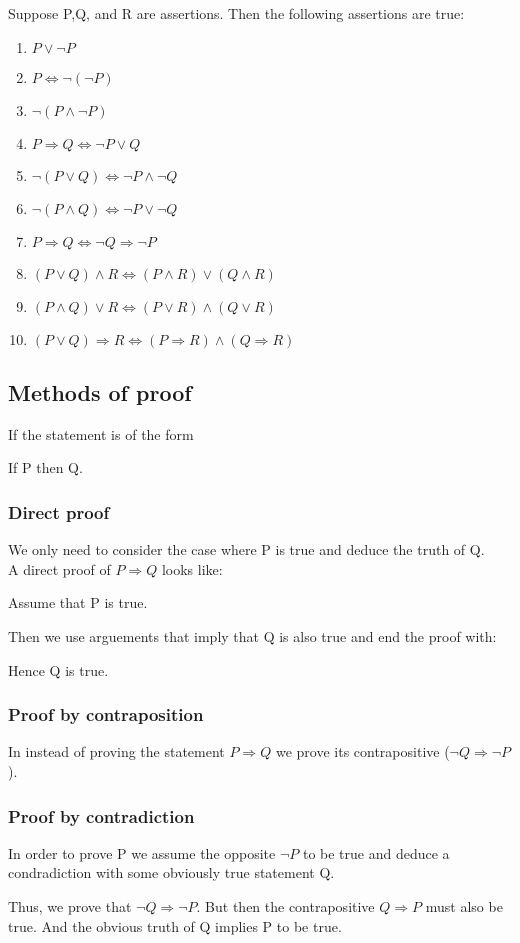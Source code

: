 \begin{theorem}
    Suppose P,Q, and R are assertions. Then the following assertions are true:
    \begin{enumerate}[label=(\alph*)]
        \item $P \lor \lnot P$
        \item $P \Leftrightarrow \lnot (\lnot P)$
        \item $\lnot (P \land \lnot P)$
        \item $P \Rightarrow Q \Leftrightarrow \lnot P \lor Q$
        \item $\lnot (P \lor Q) \Leftrightarrow \lnot P \land \lnot Q$
        \item $\lnot (P \land Q) \Leftrightarrow \lnot P \lor \lnot Q$
        \item $P \Rightarrow Q \Leftrightarrow \lnot Q \Rightarrow \lnot P$
        \item $(P \lor Q) \land R \Leftrightarrow (P \land R) \lor (Q \land R)$
        \item $(P \land Q) \lor R \Leftrightarrow (P \lor R) \land (Q \lor R)$
        \item $(P \lor Q) \Rightarrow R \Leftrightarrow (P \Rightarrow R) \land (Q \Rightarrow R)$
    \end{enumerate}
\end{theorem}

\subsection{Methods of proof}
If the statement is of the form
\begin{center}
    If P then Q.
\end{center}
\subsubsection{Direct proof}
We only need to consider the case where P is true and deduce the truth of Q. \\
A direct proof of $P \Rightarrow Q$ looks like:
\begin{center}
    Assume that P is true.
\end{center}
Then we use arguements that imply that Q is also true and end the proof with:
\begin{center}
    Hence Q is true.
\end{center}

\subsubsection{Proof by contraposition}
In instead of proving the statement $P \Rightarrow Q$ we prove its contrapositive
($\lnot Q \Rightarrow \lnot P$).
\subsubsection{Proof by contradiction}
In order to prove P we assume the opposite $\lnot P$ to be true and deduce a
condradiction with some obviously true statement Q.
\par Thus, we prove that $\lnot Q \Rightarrow \lnot P$. But then the contrapositive
$Q \Rightarrow P$ must also be true. And the obvious truth of Q implies P to be true.